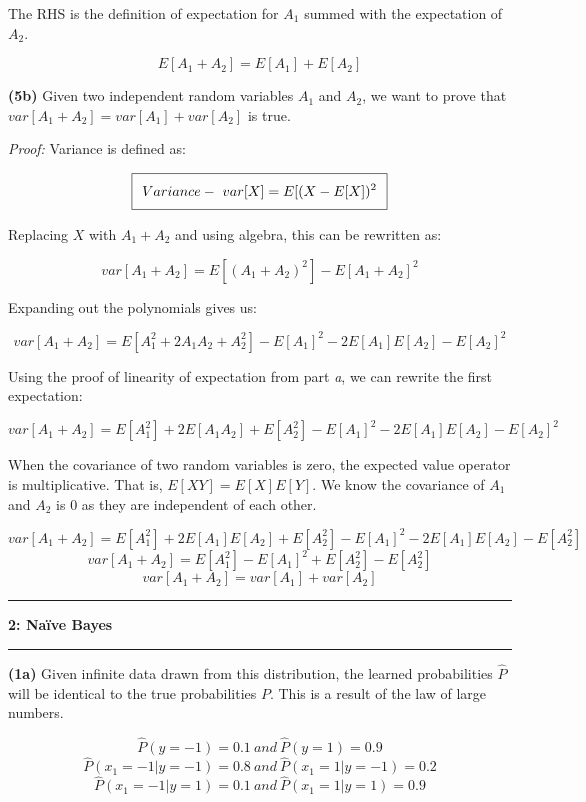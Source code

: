 \documentclass[11pt]{article}
\newcommand\question[2]{\vspace{.25in}\hrule\textbf{#1: #2}\vspace{.5em}\hrule\vspace{.10in}}
\renewcommand\part[1]{\vspace{.10in}\textbf{(#1)}}
\begin{document}
The RHS is the definition of expectation for $A_1$ summed with the expectation of $A_2$.

$$E[A_1 + A_2] = E[A_1] + E[A_2]$$

\part{5b} Given two independent random variables $A_1$ and $A_2$, we want to prove that $var[A_1 + A_2] = var[A_1] + var[A_2]$ is true.

\textit{Proof:} Variance is defined as:

\begin{equation}
\setlength\fboxsep{0.25cm}
\setlength\fboxrule{0.4pt}
\boxed{Variance - \ var[X] = E[(X - E[X])^2}
\end{equation} 

Replacing $X$ with $A_1 + A_2$ and using algebra, this can be rewritten as:

$$var[A_1 + A_2] = E[(A_1 + A_2)^2] - E[A_1 + A_2]^2$$

Expanding out the polynomials gives us:

$$var[A_1 + A_2] = E[A_1^2 + 2A_1A_2 + A_2^2] - E[A_1]^2 - 2E[A_1]E[A_2] - E[A_2]^2$$

Using the proof of linearity of expectation from part \textit{a}, we can rewrite the first expectation:

$$var[A_1 + A_2] = E[A_1^2] + 2E[A_1A_2] + E[A_2^2] - E[A_1]^2 - 2E[A_1]E[A_2] - E[A_2]^2$$ 

When the covariance of two random variables is zero, the expected value operator is multiplicative. That is, $E[XY] = E[X]E[Y]$. We know the covariance of $A_1$ and $A_2$ is 0 as they are independent of each other.

$$var[A_1 + A_2] = E[A_1^2] + 2E[A_1]E[A_2] + E[A_2^2] - E[A_1]^2 - 2E[A_1]E[A_2] - E[A_2^2]$$
$$var[A_1 + A_2] = E[A_1^2] - E[A_1]^2 + E[A_2^2] - E[A_2^2]$$
$$var[A_1 + A_2] = var[A_1] + var[A_2]$$

\question{2}{Na\"{i}ve Bayes}

\part{1a} Given infinite data drawn from this distribution, the learned probabilities $\hat P$ will be identical to the true probabilities $P$. This is a result of the law of large numbers.

$$\hat P(y = -1) = 0.1 \ and \ \hat P(y = 1) = 0.9$$
$$\hat P(x_1 = -1 | y = -1) = 0.8 \ and \  \hat P(x_1 = 1 | y = -1) = 0.2$$
$$\hat P(x_1 = -1 | y = 1) = 0.1  \ and \ \hat P(x_1 = 1 | y = 1) = 0.9$$ 
\end{document}
